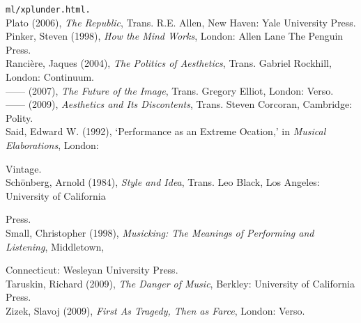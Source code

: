 \texttt{ml/xplunder.html.}\\
Plato (2006), \emph{The Republic}, Trans. R.E. Allen, New Haven: Yale University Press.\\
Pinker, Steven (1998), \emph{How the Mind Works}, London: Allen Lane The Penguin Press.\\
Ranci\`{e}re, Jaques (2004), \emph{The Politics of Aesthetics}, Trans. Gabriel Rockhill, London: Continuum. \\
------ (2007), \emph{The Future of the Image}, Trans. Gregory Elliot, London: Verso.\\
------ (2009), \emph{Aesthetics and Its Discontents}, Trans. Steven Corcoran, Cambridge: Polity.\\
Said, Edward W. (1992), `Performance as an Extreme Ocation,' in \emph{Musical Elaborations}, London: 

Vintage.\\
Sch\"{o}nberg, Arnold (1984),  \emph{Style and Idea}, Trans. Leo Black, Los Angeles: University of California

Press.\\
Small, Christopher (1998), \emph{Musicking: The Meanings of Performing and Listening}, Middletown, 

Connecticut: Wesleyan University Press.\\
Taruskin, Richard (2009), \emph{The Danger of Music}, Berkley: University of California Press.\\
Zizek, Slavoj (2009), \emph{First As Tragedy, Then as Farce}, London: Verso.\\
